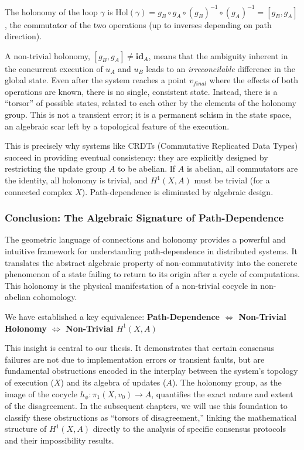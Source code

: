 \documentclass[
]{article}
\begin{document}
The holonomy of the loop \(\gamma\) is
\(\text{Hol}(\gamma) = g_B \circ g_A \circ (g_B)^{-1} \circ (g_A)^{-1} = [g_B, g_A]\),
the commutator of the two operations (up to inverses depending on path
direction).

A non-trivial holonomy, \([g_B, g_A] \neq \mathbf{id}_A\), means that
the ambiguity inherent in the concurrent execution of \(u_A\) and
\(u_B\) leads to an \emph{irreconcilable} difference in the global
state. Even after the system reaches a point \(v_{final}\) where the
effects of both operations are known, there is no single, consistent
state. Instead, there is a ``torsor'' of possible states, related to
each other by the elements of the holonomy group. This is not a
transient error; it is a permanent schism in the state space, an
algebraic scar left by a topological feature of the execution.

This is precisely why systems like CRDTs (Commutative Replicated Data
Types) succeed in providing eventual consistency: they are explicitly
designed by restricting the update group \(A\) to be abelian. If \(A\)
is abelian, all commutators are the identity, all holonomy is trivial,
and \(H^1(X, A)\) must be trivial (for a connected complex \(X\)).
Path-dependence is eliminated by algebraic design.

\subsubsection{Conclusion: The Algebraic Signature of
Path-Dependence}\label{conclusion-the-algebraic-signature-of-path-dependence}

The geometric language of connections and holonomy provides a powerful
and intuitive framework for understanding path-dependence in distributed
systems. It translates the abstract algebraic property of
non-commutativity into the concrete phenomenon of a state failing to
return to its origin after a cycle of computations. This holonomy is the
physical manifestation of a non-trivial cocycle in non-abelian
cohomology.

We have established a key equivalence: \textbf{Path-Dependence \(\iff\)
Non-Trivial Holonomy \(\iff\) Non-Trivial \(H^1(X, A)\)}

This insight is central to our thesis. It demonstrates that certain
consensus failures are not due to implementation errors or transient
faults, but are fundamental obstructions encoded in the interplay
between the system's topology of execution (\(X\)) and its algebra of
updates (\(A\)). The holonomy group, as the image of the cocycle
\(h_\phi: \pi_1(X, v_0) \to A\), quantifies the exact nature and extent
of the disagreement. In the subsequent chapters, we will use this
foundation to classify these obstructions as ``torsors of
disagreement,'' linking the mathematical structure of \(H^1(X, A)\)
directly to the analysis of specific consensus protocols and their
impossibility results.
\end{document}

